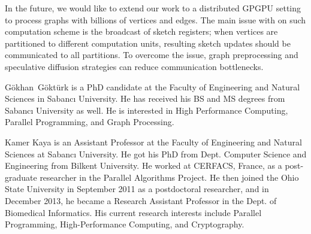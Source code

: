 \documentclass[10pt,journal,compsoc]{IEEEtran}
\newcommand\acro{{\sc{HyperFuseR\xspace}\xspace}\xspace}
\begin{document}
In the future, we would like to extend our work to a distributed GPGPU setting to process graphs with billions of vertices and edges. The main issue with \acro on such computation scheme is the broadcast of sketch registers; when vertices are partitioned to different computation units, resulting sketch updates should be communicated to all partitions. To overcome the issue, graph preprocessing and speculative diffusion strategies can reduce communication bottlenecks. 



\ifCLASSOPTIONcaptionsoff
  \newpage
\fi




\begin{IEEEbiography}{G\"{o}khan~G\"{o}kt\"{u}rk} is a PhD candidate at the Faculty of Engineering and Natural Sciences in Sabancı University. He has received his BS and MS degrees from Sabancı University as well. He is interested in High Performance Computing, Parallel Programming, and Graph Processing.
\end{IEEEbiography}
\begin{IEEEbiography}{Kamer Kaya} is an Assistant Professor at the Faculty of Engineering and Natural Sciences at Sabancı University. He got his PhD from Dept. Computer Science and Engineering from Bilkent University. He worked at CERFACS, France, as a post-graduate researcher in the Parallel Algorithms Project. He then joined the Ohio State University in September 2011 as a postdoctoral researcher, and in December 2013, he became a Research Assistant Professor in the Dept. of Biomedical Informatics.
His current research interests include Parallel Programming, High-Performance Computing, and Cryptography. 
    \end{IEEEbiography}
\end{document}
